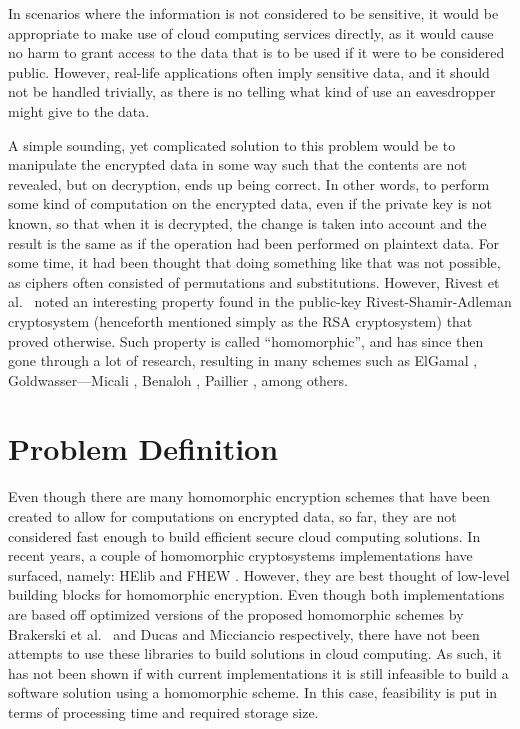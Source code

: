 In scenarios where the information is not considered to be sensitive, it would be appropriate to make use of cloud computing services directly, as it would cause no harm to grant access to the data that is to be used if it were to be considered public. However, real-life applications often imply sensitive data, and it should not be handled trivially, as there is no telling what kind of use an eavesdropper might give to the data.

A simple sounding, yet complicated solution to this problem would be to manipulate the encrypted data in some way such that the contents are not revealed, but on decryption, ends up being correct. In other words, to perform some kind of computation on the encrypted data, even if the private key is not known, so that when it is decrypted, the change is taken into account and the result is the same as if the operation had been performed on plaintext data. For some time, it had been thought that doing something like that was not possible, as ciphers often consisted of permutations and substitutions. However, Rivest et al.\ \cite{rivest1978data} noted an interesting property found in the public-key Rivest-Shamir-Adleman cryptosystem (henceforth mentioned simply as the RSA cryptosystem) that proved otherwise. Such property is called ``homomorphic'', and has since then gone through a lot of research, resulting in many schemes such as ElGamal \cite{ElGamal:1985:PKC:19478.19480}, Goldwasser---Micali \cite{Goldwasser:1982:PEA:800070.802212}, Benaloh \cite{benaloh1994dense}, Paillier \cite{Paillier:1999:PCB:1756123.1756146}, among others.

\section{Problem Definition}

Even though there are many homomorphic encryption schemes that have been created to allow for computations on encrypted data, so far, they are not considered fast enough to build efficient secure cloud computing solutions. In recent years, a couple of homomorphic cryptosystems implementations have surfaced, namely: HElib \cite{helib} and FHEW \cite{fhew}. However, they are best thought of low-level building blocks for homomorphic encryption. Even though both implementations are based off optimized versions of the proposed homomorphic schemes by Brakerski et al.\ \cite{cryptoeprint:2011:277} and Ducas and Micciancio \cite{fhew} respectively, there have not been attempts to use these libraries to build solutions in cloud computing. As such, it has not been shown if with current implementations it is still infeasible to build a software solution using a homomorphic scheme. In this case, feasibility is put in terms of processing time and required storage size. 

